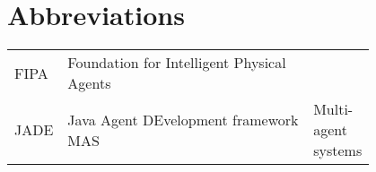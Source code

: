 \chapter*{Abbreviations}

\begin{flushleft}
\begin{tabular}{l p{0.8\linewidth}}
FIPA	 & Foundation for Intelligent Physical Agents\\
JADE	 & Java Agent DEvelopment framework
MAS      & Multi-agent systems\\

\end{tabular}
\end{flushleft}

